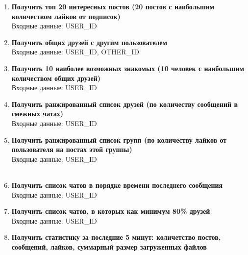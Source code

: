 \documentclass[12pt, a4paper] {ncc}
\begin{document}
\begin{enumerate}

\item \textbf{Получить топ 20 интересных постов (20 постов с наибольшим количеством лайков от подписок)} \\
Входные данные: USER\_ID

\item \textbf{Получить общих друзей с другим пользователем} \\
Входные данные: USER\_ID, OTHER\_ID

\item \textbf{Получить 10 наиболее возможных знакомых (10 человек с наибольшим количеством общих друзей)} \\
Входные данные: USER\_ID \\

\item \textbf{Получить ранжированный список друзей (по количеству сообщений в смежных чатах)} \\
Входные данные: USER\_ID

\item \textbf{Получить ранжированный список групп (по количеству лайков от пользователя на постах этой группы)} \\
Входные данные: USER\_ID \\\\

\item \textbf{Получить список чатов в порядке времени последнего сообщения} \\
Входные данные: USER\_ID

\item \textbf{Получить список чатов, в которых как минимум 80\% друзей} \\
Входные данные: USER\_ID

\item \textbf{Получить статистику за последние 5 минут: количетство постов, сообщений, лайков, суммарный размер загруженных файлов} \\

\end{enumerate}
\end{document}
